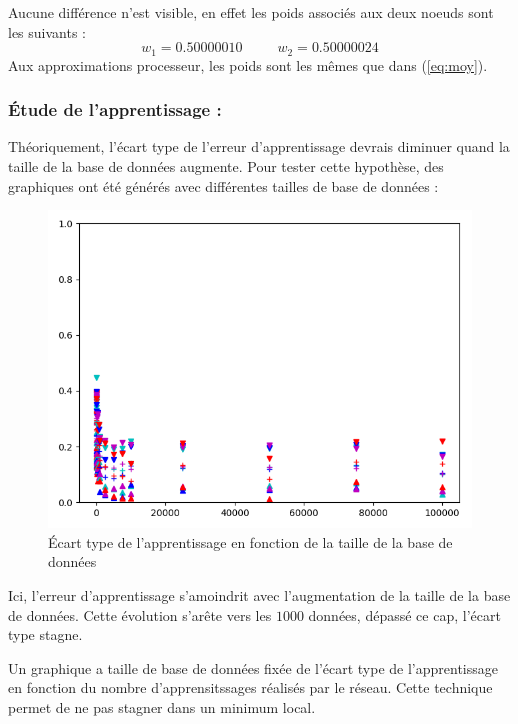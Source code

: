 Aucune différence n'est visible, en effet les poids associés aux deux noeuds sont les suivants :
\begin{equation*}
    w_1 = 0.50000010
    \;\;\;\;\;\;\;\;\;
    w_2 = 0.50000024
\end{equation*}
Aux approximations processeur, les poids sont les mêmes que dans (\ref{eq:moy}).


\subsubsection{Étude de l'apprentissage :}\label{subsec:app}
Théoriquement, l'écart type de l'erreur d'apprentissage devrais
diminuer quand la taille de la base de données augmente.
Pour tester cette hypothèse, des graphiques ont été générés avec
différentes tailles de base de données :

\begin{figure}[H]
    \center
    \includegraphics[height=\moyen]{pict/appfd.png}
	\caption{Écart type de l'apprentissage en fonction de la taille de la base de données}
	\label{fig:etfdata2graph}
\end{figure}
\vspace{-5pt}
Ici, l'erreur d'apprentissage s'amoindrit avec l'augmentation de la taille de la base de données.
Cette évolution s'arête vers les $1000$ données, dépassé ce cap, l'écart type stagne.


Un graphique a taille de base de données fixée de l'écart type de l'apprentissage
en fonction du nombre d'apprensitssages réalisés par le réseau.
Cette technique permet de ne pas stagner dans un minimum local.

